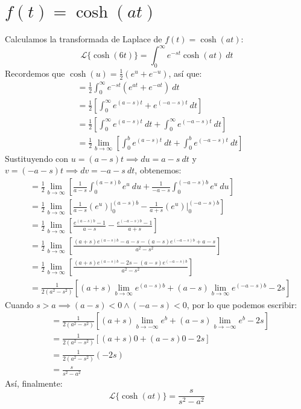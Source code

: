 \documentclass[12pt, a4paper]{article}
\begin{document}
\setcounter{section}{16}
\section{\texorpdfstring{\(f(t)=\cosh(at)\)}{f (t) = cosh (at)}}

Calculamos la transformada de Laplace de \(f(t) = \cosh(at)\):
\[
	\mathcal{L}\{\cosh(6t)\} = \int_{0}^{\infty} e^{-st} \cosh(at) \ dt
\]
Recordemos que \(\cosh(u) = \frac{1}{2} \left( e^{u} + e^{-u} \right) \), así que:
\begin{align*}
	&= \frac{1}{2} \int_{0}^{\infty} e^{-st} \left( e^{at} + e^{-at} \right)  \ dt \\
	&= \frac{1}{2} \left[ \int_{0}^{\infty} e^{(a-s)t} + e^{(-a-s)t} \ dt \right] \\
	&= \frac{1}{2} \left[ \int_{0}^{\infty} e^{(a-s)t} \ dt + \int_{0}^{\infty} e^{(-a-s)t} \ dt \right] \\
	&= \frac{1}{2} \lim_{b \to \infty} \left[ \int_{0}^{b} e^{(a-s)t} \ dt + \int_{0}^{b} e^{(-a-s)t} \ dt \right]
\end{align*}
Sustituyendo con \(u = (a-s)t \implies du = a-s\ dt\) y \(v = (-a-s)t \implies dv = -a-s\ dt\), obtenemos:
\begin{align*}
	&= \frac{1}{2} \lim_{b \to \infty} \left[ \frac{1}{a-s} \int_{0}^{(a-s)b} e^{u} \ du + \frac{1}{-a-s} \int_{0}^{(-a-s)b} e^{u} \ du \right] \\
	&= \frac{1}{2} \lim_{b \to \infty} \left[ \frac{1}{a-s} \left. \left( e^{u} \right) \right|_{0}^{(a-s)b} - \frac{1}{a+s} \left. \left( e^{u} \right) \right|_{0}^{(-a-s)b} \right] \\
	&= \frac{1}{2} \lim_{b \to \infty} \left[ \frac{e^{(a-s)b} - 1}{a-s} - \frac{e^{(-a-s)b} - 1}{a+s} \right] \\
	&= \frac{1}{2} \lim_{b \to \infty} \left[ \frac{(a+s) e^{(a-s)b} - a - s - (a-s)e^{(-a-s)b} + a - s}{a^{2} - s ^{2}} \right] \\
	&= \frac{1}{2} \lim_{b \to \infty} \left[ \frac{(a+s) e^{(a-s)b} - 2s - (a-s)e^{(-a-s)b}}{a^{2}-s ^{2}} \right] \\
	&= \frac{1}{2(a^{2}-s ^{2})} \left[ (a+s) \lim_{b \to \infty} e^{(a-s)b} + (a-s) \lim_{b \to \infty} e^{(-a-s)b} - 2s \right]
\end{align*}
Cuando \(s > a \implies (a-s) < 0 \land (-a-s) < 0\), por lo que podemos escribir:
\begin{align*}
	&= \frac{1}{2(a^{2}-s ^{2})} \left[ (a+s) \lim_{b \to -\infty} e^{b} + (a-s) \lim_{b \to -\infty} e^{b} - 2s \right] \\
	&= \frac{1}{2(a^{2}-s ^{2})} \left[ (a+s) 0 + (a-s) 0 - 2s \right] \\
	&= \frac{1}{2(a^{2}-s ^{2})} (-2s) \\
	&= \frac{s}{s ^{2} - a^{2}}
\end{align*}
Así, finalmente:
\[
	\mathcal{L}\{\cosh(at)\} = \frac{s}{s ^{2} - a^{2}}
\]
\end{document}
